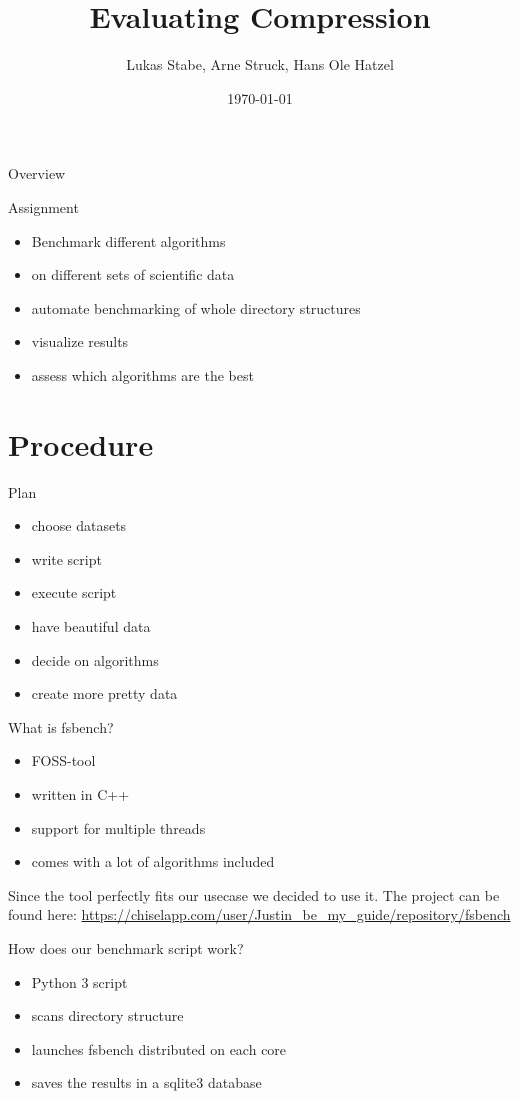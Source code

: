 \documentclass[10pt, compress]{beamer}
\title{Evaluating Compression}
\date{\today}
\author{Lukas Stabe, Arne Struck, Hans Ole Hatzel}
\begin{document}
\maketitle
\begin{frame}{Overview}
    \tableofcontents
\end{frame}


\begin{frame}{Assignment}
    \begin{itemize}
        \item Benchmark different algorithms
        \item on different sets of scientific data
        \item automate benchmarking of whole directory structures
        \item visualize results
        \item assess which algorithms are the best
    \end{itemize}
\end{frame}

\section{Procedure}
\begin{frame}{Plan}
    \begin{itemize}
        \item choose datasets
        \item write script
        \item execute script
        \item have beautiful data
        \item decide on algorithms
        \item create more pretty data
    \end{itemize}
\end{frame}
\begin{frame}{What is fsbench?}
    \begin{itemize}
        \item FOSS-tool
        \item written in C++
        \item support for multiple threads
        \item comes with a lot of algorithms included
    \end{itemize}
    \vspace{1em}
    Since the tool perfectly fits our usecase we decided to use it.
    The project can be found here:    
    \url{https://chiselapp.com/user/Justin_be_my_guide/repository/fsbench}
\end{frame}
\begin{frame}{How does our benchmark script work?}
    \begin{itemize}
        \item Python 3 script
        \item scans directory structure
        \item launches fsbench distributed on each core
        \item saves the results in a sqlite3 database
    \end{itemize}    
\end{frame}
\end{document}
